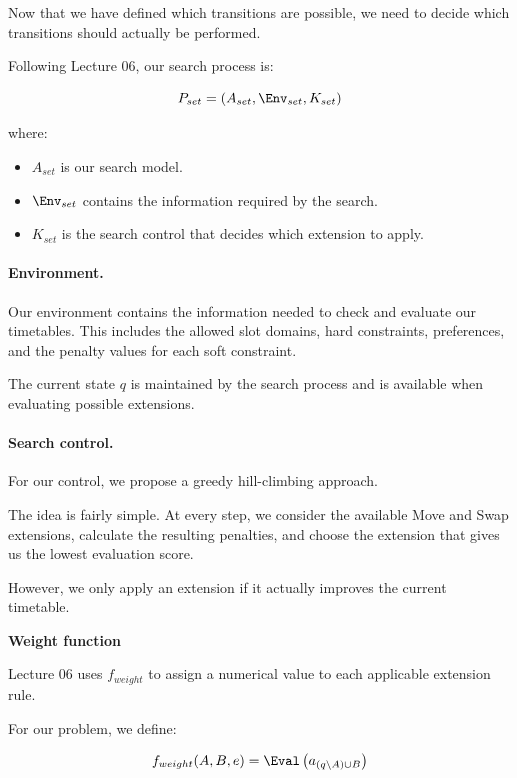Now that we have defined which transitions are possible, we need to decide which transitions should actually be performed.

Following Lecture 06, our search process is:

\begin{equation}
    P_{set}=(A_{set},\Env_{set},K_{set})
\end{equation}

where:
\begin{itemize}
    \item $A_{set}$ is our search model.
    \item $\Env_{set}$ contains the information required by the search.
    \item $K_{set}$ is the search control that decides which extension to apply.
\end{itemize}

\paragraph{Environment.}

Our environment contains the information needed to check and evaluate our timetables. This includes the allowed slot domains, hard constraints, preferences, and the penalty values for each soft constraint.

The current state $q$ is maintained by the search process and is available when evaluating possible extensions.

\paragraph{Search control.}

For our control, we propose a greedy hill-climbing approach.

The idea is fairly simple. At every step, we consider the available Move and Swap extensions, calculate the resulting penalties, and choose the extension that gives us the lowest evaluation score.

However, we only apply an extension if it actually improves the current timetable.

\textbf{Weight function}

Lecture 06 uses $f_{weight}$ to assign a numerical value to each applicable extension rule.

For our problem, we define:

\begin{equation}
    f_{weight}(A,B,e)=
    \Eval\left(a_{(q\setminus A)\cup B}\right)
\end{equation}

